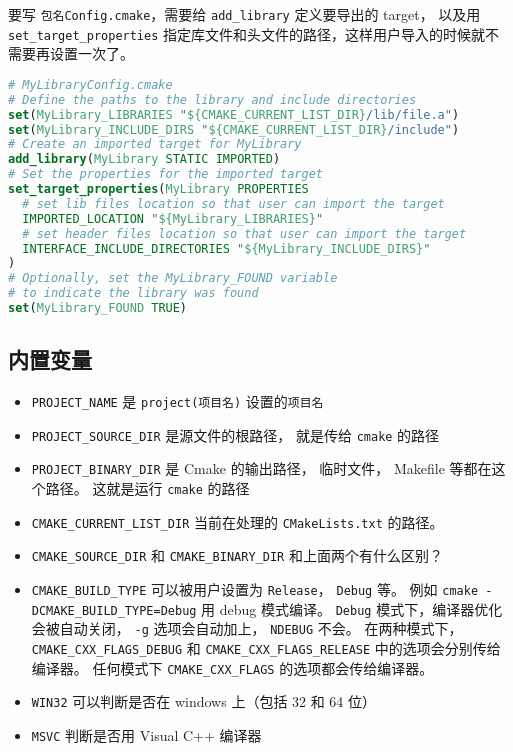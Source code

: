 要写 \verb`包名Config.cmake`，需要给 \verb`add_library` 定义要导出的 target， 以及用 \verb`set_target_properties` 指定库文件和头文件的路径，这样用户导入的时候就不需要再设置一次了。
\begin{lstlisting}[language=cmake]
# MyLibraryConfig.cmake
# Define the paths to the library and include directories
set(MyLibrary_LIBRARIES "${CMAKE_CURRENT_LIST_DIR}/lib/file.a")
set(MyLibrary_INCLUDE_DIRS "${CMAKE_CURRENT_LIST_DIR}/include")
# Create an imported target for MyLibrary
add_library(MyLibrary STATIC IMPORTED)
# Set the properties for the imported target
set_target_properties(MyLibrary PROPERTIES
  # set lib files location so that user can import the target
  IMPORTED_LOCATION "${MyLibrary_LIBRARIES}"
  # set header files location so that user can import the target
  INTERFACE_INCLUDE_DIRECTORIES "${MyLibrary_INCLUDE_DIRS}"
)
# Optionally, set the MyLibrary_FOUND variable
# to indicate the library was found
set(MyLibrary_FOUND TRUE)
\end{lstlisting}

\subsection{内置变量}
\begin{itemize}
\item \verb`PROJECT_NAME` 是 \verb`project(项目名)` 设置的\verb`项目名`
\item \verb`PROJECT_SOURCE_DIR` 是源文件的根路径， 就是传给 \verb`cmake` 的路径
\item \verb`PROJECT_BINARY_DIR` 是 Cmake 的输出路径， 临时文件， Makefile 等都在这个路径。 这就是运行 \verb`cmake` 的路径
\item \verb`CMAKE_CURRENT_LIST_DIR` 当前在处理的 \verb`CMakeLists.txt` 的路径。
\item \verb`CMAKE_SOURCE_DIR` 和 \verb`CMAKE_BINARY_DIR` 和上面两个有什么区别？
\item \verb`CMAKE_BUILD_TYPE` 可以被用户设置为 \verb`Release`， \verb`Debug` 等。 例如 \verb`cmake -DCMAKE_BUILD_TYPE=Debug` 用 debug 模式编译。 \verb`Debug` 模式下，编译器优化会被自动关闭， \verb`-g` 选项会自动加上， \verb`NDEBUG` 不会。 在两种模式下， \verb`CMAKE_CXX_FLAGS_DEBUG` 和 \verb`CMAKE_CXX_FLAGS_RELEASE` 中的选项会分别传给编译器。 任何模式下 \verb`CMAKE_CXX_FLAGS` 的选项都会传给编译器。
\item \verb`WIN32` 可以判断是否在 windows 上（包括 32 和 64 位）
\item \verb`MSVC` 判断是否用 Visual C++ 编译器
\end{itemize}

